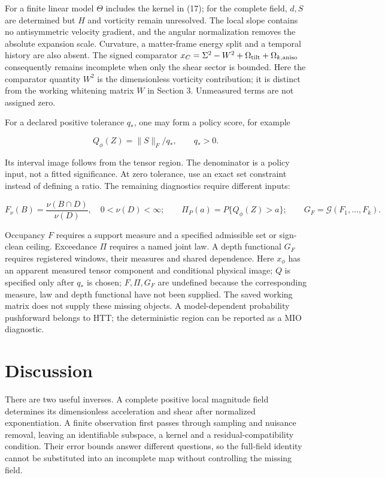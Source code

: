 \documentclass[aps,prd,reprint,onecolumn,11pt,nofootinbib,notitlepage]{revtex4-2}
\begin{document}
For a finite linear model \(\Theta\) includes the kernel in (17); for the complete field, \(d,S\) are determined but \(H\) and vorticity remain unresolved. The local slope contains no antisymmetric velocity gradient, and the angular normalization removes the absolute expansion scale. Curvature, a matter-frame energy split and a temporal history are also absent. The signed comparator \(x_C=\Sigma^2-W^2+\Omega_{\rm tilt}+\Omega_{k,\rm aniso}\) consequently remains incomplete when only the shear sector is bounded. Here the comparator quantity \(W^2\) is the dimensionless vorticity contribution; it is distinct from the working whitening matrix \(W\) in Section 3. Unmeasured terms are not assigned zero.

For a declared positive tolerance \(q_*\), one may form a policy score, for example

\begin{equation}
 Q_\phi(Z)=\|S\|_F/q_*,\qquad q_*>0 .\tag{34}
\end{equation}

Its interval image follows from the tensor region. The denominator is a policy input, not a fitted significance. At zero tolerance, use an exact set constraint instead of defining a ratio. The remaining diagnostics require different inputs:

\begin{equation}
 F_\nu(B)=\frac{\nu(B\cap D)}{\nu(D)},\quad 0<\nu(D)<\infty;
 \qquad \Pi_P(a)=P\{Q_\phi(Z)>a\};
 \qquad G_F=\mathcal G(F_1,\ldots,F_k).\tag{35}
\end{equation}

Occupancy \(F\) requires a support measure and a specified admissible set or sign-clean ceiling. Exceedance \(\Pi\) requires a named joint law. A depth functional \(G_F\) requires registered windows, their measures and shared dependence. Here \(x_\phi\) has an apparent measured tensor component and conditional physical image; \(Q\) is specified only after \(q_*\) is chosen; \(F,\Pi,G_F\) are undefined because the corresponding measure, law and depth functional have not been supplied. The saved working matrix does not supply these missing objects. A model-dependent probability pushforward belongs to HTT; the deterministic region can be reported as a MIO diagnostic.

\section{Discussion}

There are two useful inverses. A complete positive local magnitude field determines its dimensionless acceleration and shear after normalized exponentiation. A finite observation first passes through sampling and nuisance removal, leaving an identifiable subspace, a kernel and a residual-compatibility condition. Their error bounds answer different questions, so the full-field identity cannot be substituted into an incomplete map without controlling the missing field.
\end{document}
